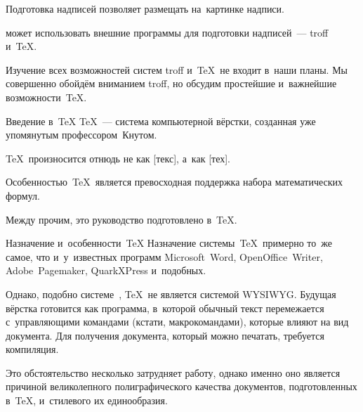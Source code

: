 	{}


\begin{frame}{Подготовка надписей}
 позволяет размещать на~картинке надписи.

 может использовать внешние программы для подготовки
надписей~— troff и~\TeX.

Изучение всех возможностей систем troff и~\TeX\ не входит в~наши планы. Мы
совершенно обойдём вниманием troff, но обсудим простейшие и~важнейшие
возможности~\TeX.
\end{frame}


\begin{frame}{Введение в~\TeX}
\TeX~— система компьютерной вёрстки, созданная уже упомянутым
профессором Кнутом.

\alert{\TeX\ произносится отнюдь не как [текс], а~как [тех].}

Особенностью~\TeX\ является превосходная поддержка набора математических
формул.

Между прочим, это руководство подготовлено в~\TeX.
\end{frame}


\begin{frame}{Назначение и~особенности~\TeX}
Назначение системы~\TeX\ примерно то~же самое, что и~у~известных программ
Microsoft Word, OpenOffice Writer, Adobe Pagemaker, QuarkXPress и~подобных.

Однако, подобно системе~, \TeX\ \alert{не} является системой
WYSIWYG. Будущая вёрстка готовится как программа, в~которой обычный текст
перемежается с~управляющими командами (кстати, макрокомандами), которые влияют
на вид документа. Для получения документа, который можно печатать, требуется
компиляция.

Это обстоятельство несколько затрудняет работу, однако именно оно является
причиной великолепного полиграфического качества документов, подготовленных
в~\TeX, и~стилевого их единообразия.
\end{frame}


